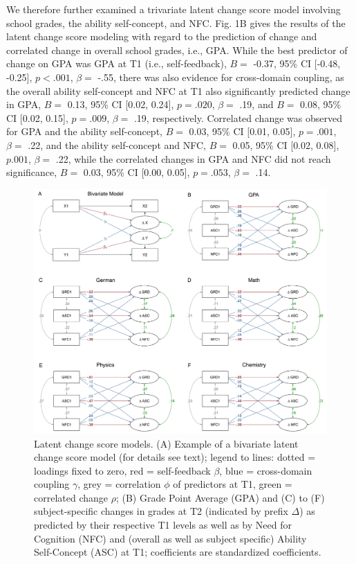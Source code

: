 \documentclass[
  man]{apa6}
\begin{document}
We therefore further examined a trivariate latent change score model involving school grades, the ability self-concept, and NFC. Fig. 1B gives the results of the latent change score modeling with regard to the prediction of change and correlated change in overall school grades, i.e., GPA. While the best predictor of change on GPA was GPA at T1 (i.e., self-feedback), \(B=\) -0.37, 95\% CI {[}-0.48, -0.25{]}, \(p< .001\), \(\beta=\) -.55, there was also evidence for cross-domain coupling, as the overall ability self-concept and NFC at T1 also significantly predicted change in GPA, \(B=\) 0.13, 95\% CI {[}0.02, 0.24{]}, \(p=.020\), \(\beta=\) .19, and \(B=\) 0.08, 95\% CI {[}0.02, 0.15{]}, \(p=.009\), \(\beta=\) .19, respectively. Correlated change was observed for GPA and the ability self-concept, \(B=\) 0.03, 95\% CI {[}0.01, 0.05{]}, \(p=.001\), \(\beta=\) .22, and the ability self-concept and NFC, \(B=\) 0.05, 95\% CI {[}0.02, 0.08{]}, \(p.001\), \(\beta=\) .22, while the correlated changes in GPA and NFC did not reach significance, \(B=\) 0.03, 95\% CI {[}0.00, 0.05{]}, \(p=.053\), \(\beta=\) .14.

\begin{figure}
\centering
\includegraphics{"Fig1.jpg"}
\caption{Latent change score models. (A) Example of a bivariate latent change score model (for details see text); legend to lines: dotted = loadings fixed to zero, red = self-feedback \(\beta\), blue = cross-domain coupling \(\gamma\), grey = correlation \(\phi\) of predictors at T1, green = correlated change \(\rho\); (B) Grade Point Average (GPA) and (C) to (F) subject-specific changes in grades at T2 (indicated by prefix \(\Delta\)) as predicted by their respective T1 levels as well as by Need for Cognition (NFC) and (overall as well as subject specific) Ability Self-Concept (ASC) at T1; coefficients are standardized coefficients.}
\end{figure}
\end{document}
